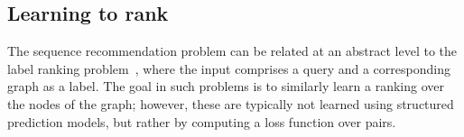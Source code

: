 \secmoveup
\subsection{Learning to rank}
\textmoveup

The sequence recommendation problem can be related at an abstract level to the label ranking problem~\citep{Dekel:2003},
where the input comprises a query and a corresponding graph as a label.
The goal in such problems is to similarly learn a ranking over the nodes of the graph;
however, these are typically not learned using structured prediction models,
but rather by computing a loss function over pairs.


